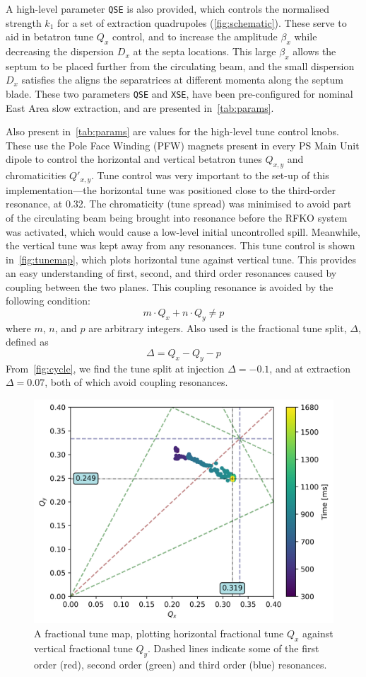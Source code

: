 \documentclass[11pt]{report}
\begin{document}
A high-level parameter \verb|QSE| is also provided, which controls the normalised strength $k_1$ for a set of extraction quadrupoles (\autoref{fig:schematic}). These serve to aid in betatron tune $Q_x$ control, and to increase the amplitude $\beta_x$ while decreasing the dispersion $D_x$ at the septa locations. This large $\beta_x$ allows the septum to be placed further from the circulating beam, and the small dispersion $D_x$ satisfies the aligns the separatrices at different momenta along the septum blade. These two parameters \verb|QSE| and \verb|XSE|, have been pre-configured for nominal East Area slow extraction, and are presented in~\autoref{tab:params}. 

Also present in~\autoref{tab:params} are values for the high-level tune control knobs. These use the Pole Face Winding (PFW) magnets present in every PS Main Unit dipole to control the horizontal and vertical betatron tunes $Q_{x, y}$ and chromaticities $Q'_{x, y}$. Tune control was very important to the set-up of this implementation---the horizontal tune was positioned close to the third-order resonance, at 0.32. The chromaticity (tune spread) was minimised to avoid part of the circulating beam being brought into resonance before the RFKO system was activated, which would cause a low-level initial uncontrolled spill. Meanwhile, the vertical tune was kept away from any resonances. This tune control is shown in~\autoref{fig:tunemap}, which plots horizontal tune against vertical tune. This provides an easy understanding of first, second, and third order resonances caused by coupling between the two planes. This coupling resonance is avoided by the following condition:
\begin{equation}
  m\cdot Q_x+n\cdot Q_y\neq p
\end{equation} where $m$, $n$, and $p$ are arbitrary integers. Also used is the fractional tune split, $\Delta$, defined as
\begin{equation}
  \Delta = Q_x-Q_y-p
\end{equation}
From~\autoref{fig:cycle}, we find the tune split at injection $\Delta=-0.1$, and at extraction $\Delta=0.07$, both of which avoid coupling resonances.

\begin{figure}
  \centering
  \includegraphics[width=0.6\linewidth]{tunemap.png}
  \caption{A fractional tune map, plotting horizontal fractional tune $Q_x$ against vertical fractional tune $Q_y$. Dashed lines indicate some of the first order (red), second order (green) and third order (blue) resonances.}\label{fig:tunemap}
\end{figure}
\end{document}

